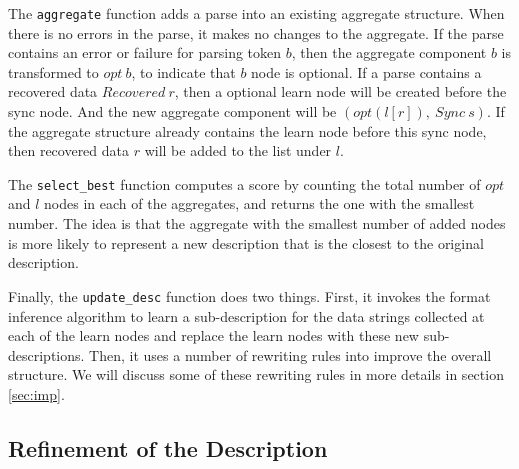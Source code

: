 {The {\tt aggregate} function adds a parse into an existing aggregate structure. When there is
no errors in the parse, it makes no changes to the aggregate. If the parse contains 
an error or failure for parsing token $b$, then the aggregate component 
$b$ is transformed to $opt~ b$, to indicate that $b$ node is optional. 
If a parse contains a recovered data $Recovered~ r$, then
a optional learn node will be created before the sync node. And the new aggregate component will be
$(opt (l [r]),~ Sync~ s)$. If the aggregate structure already contains the learn node before this
sync node, then recovered data $r$ will be added to the list under $l$.

The {\tt select\_best} function computes a score by counting the total number of $opt$ and $l$ nodes
in each of the aggregates, and returns the one with the smallest number. The idea is that the
aggregate with the smallest number of added nodes is more likely to represent a new description
that is the closest to the original description. 

Finally, the {\tt update\_desc} function does two things. First, it invokes the format inference
algorithm to learn a sub-description for the data strings collected at each of the learn nodes
and replace the learn nodes with these new sub-descriptions. Then, it uses a number of rewriting
rules into improve the overall structure. We will discuss some of these rewriting rules in more
details in section \ref{sec:imp}.

}%

\subsection{Refinement of the Description}



